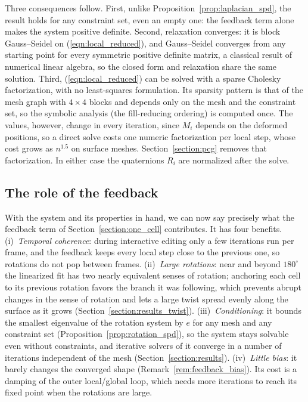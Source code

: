 \documentclass{birkjour}
\theoremstyle{remark}
\numberwithin{equation}{section}
\begin{document}
Three consequences follow. First, unlike Proposition~\ref{prop:laplacian_spd}, the result holds for any constraint set, even an empty one: the feedback term alone makes the system positive definite. Second, relaxation converges: it is block Gauss--Seidel on (\ref{eqn:local_reduced}), and Gauss--Seidel converges from any starting point for every symmetric positive definite matrix, a classical result of numerical linear algebra, so the closed form and relaxation share the same solution. Third, (\ref{eqn:local_reduced}) can be solved with a sparse Cholesky factorization, with no least-squares formulation. Its sparsity pattern is that of the mesh graph with $4 \times 4$ blocks and depends only on the mesh and the constraint set, so the symbolic analysis (the fill-reducing ordering) is computed once. The values, however, change in every iteration, since $M_i$ depends on the deformed positions, so a direct solve costs one numeric factorization per local step, whose cost grows as $n^{1.5}$ on surface meshes. Section~\ref{section:pcg} removes that factorization. In either case the quaternions $R_i$ are normalized after the solve.

\subsection{The role of the feedback}
\label{section:feedback}

With the system and its properties in hand, we can now say precisely what the feedback term of Section~\ref{section:one_cell} contributes. It has four benefits. (i)~\emph{Temporal coherence}: during interactive editing only a few iterations run per frame, and the feedback keeps every local step close to the previous one, so rotations do not pop between frames. (ii)~\emph{Large rotations}: near and beyond $180^\circ$ the linearized fit has two nearly equivalent senses of rotation; anchoring each cell to its previous rotation favors the branch it was following, which prevents abrupt changes in the sense of rotation and lets a large twist spread evenly along the surface as it grows (Section~\ref{section:results_twist}). (iii)~\emph{Conditioning}: it bounds the smallest eigenvalue of the rotation system by $e$ for any mesh and any constraint set (Proposition~\ref{prop:rotation_spd}), so the system stays solvable even without constraints, and iterative solvers of it converge in a number of iterations independent of the mesh (Section~\ref{section:results}). (iv)~\emph{Little bias}: it barely changes the converged shape (Remark~\ref{rem:feedback_bias}). Its cost is a damping of the outer local/global loop, which needs more iterations to reach its fixed point when the rotations are large.
\end{document}
